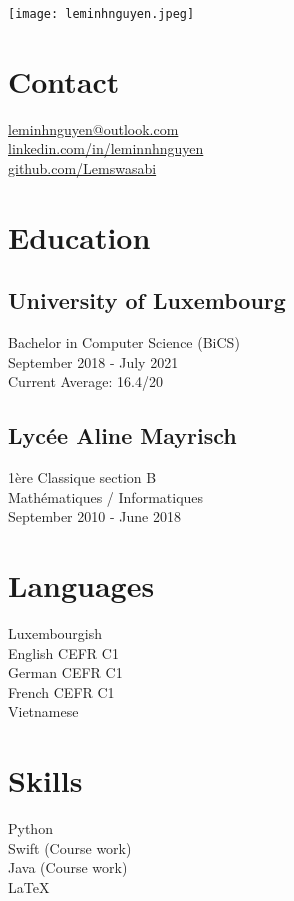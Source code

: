 \documentclass[]{curriculumvitae}
\begin{document}
\hfill \texttt{[image: leminhnguyen.jpeg]}
    
\begin{minipage}[t]{0.34\textwidth} 

\section{Contact}
\faEnvelope \hspace{1em} \href{}{leminhnguyen@outlook.com}\\ 
\faLinkedin \hspace{1em} \href{https://www.linkedin.com/in/leminnhnguyen}{linkedin.com/in/leminnhnguyen}\\
\faGithub \hspace{1em} \href{https://github.com/Lemswasabi}{github.com/Lemswasabi}
\sectionsep

\section{Education} 
\subsection{University of Luxembourg}
Bachelor in Computer Science (BiCS)\\
September 2018 - July 2021\\
Current Average: 16.4/20\\

\subsection{Lycée Aline Mayrisch}
1ère Classique section B\\
Mathématiques / Informatiques\\
September 2010 - June 2018
\sectionsep

\section{Languages}
Luxembourgish\\
English CEFR C1\\
German CEFR C1\\
French CEFR C1\\
Vietnamese
\sectionsep

\section{Skills}
Python\\
Swift (Course work)\\
Java (Course work)\\
LaTeX
\sectionsep


\end{minipage}
\end{document}
